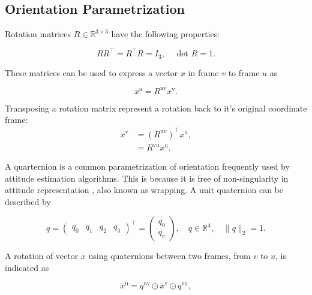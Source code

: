 \subsection{Orientation Parametrization}
Rotation matrices $R \in \mathbb{R}^{3 \times 3}$ have the following properties:

\begin{equation}
	\label{eq:rot_mat_properties}
	R R^{\top}=R^{\top} R=I_{3}, \quad \text { det } R=1.
\end{equation}

These matrices can be used to express a vector $x$ in frame $v$ to frame $u$ as 

\begin{equation}
	\label{eq:rot_mat_rot_x}
	x^{\mathfrak{u}}=R^{\mathfrak{u} \mathrm{v}} x^{\mathrm{v}}.
\end{equation}

Transposing a rotation matrix represent a rotation back to it's original coordinate frame:
\begin{subequations}
	\begin{align}
		\label{eq:rot_mat_trans}
		x^{\mathrm{v}}&=\left(R^{\mathrm{uv}}\right)^{\top} x^{\mathrm{u}},\\
		&=R^{\mathrm{vu}} x^{\mathrm{u}}.
	\end{align}
\end{subequations}

A quarternion is a common parametrization of orientation frequently used by attitude estimation algorithms. This is because it is free of non-singularity in attitude representation \cite{Hashim2019}, also known as wrapping. A unit quaternion can be described by

\begin{equation}
	\label{eq:unit_quarternion}
	q=\left(\begin{array}{llll}{q_{0}} & {q_{1}} & {q_{2}} & {q_{3}}\end{array}\right)^{\top}
	=\left(\begin{array}{l}{q_{0}} \\ {q_{v}}\end{array}\right), 
	\quad q \in \mathbb{R}^{4}, 
	\quad\|q\|_{2}=1.
\end{equation}

A rotation of vector $x$ using quaternions between two frames, from $v$ to $u$, is indicated as

\begin{equation}
	\label{eq:quat_rot}
	\bar{x}^{\mathrm{u}}=q^{\mathrm{uv}} \odot \bar{x}^{\mathrm{v}} \odot q^{\mathrm{vu}},
\end{equation}

